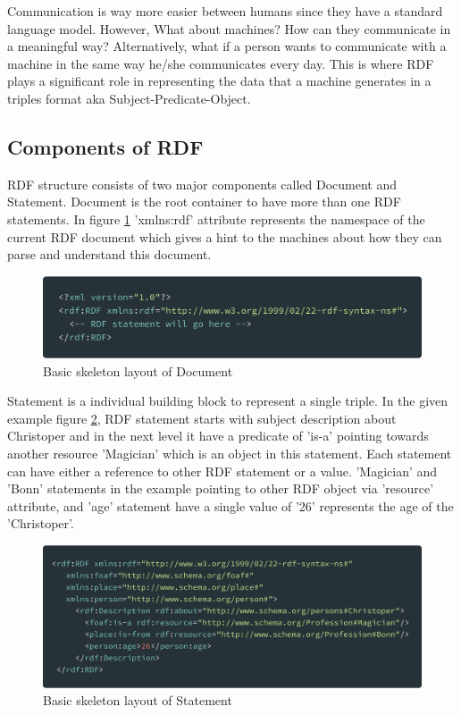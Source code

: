 	Communication is way more easier between humans since they have a standard language model. However, What about machines? How can they communicate in a meaningful way? Alternatively, what if a person wants to communicate with a machine in the same way he/she communicates every day. This is where RDF plays a significant role in representing the data that a machine generates in a triples format aka Subject-Predicate-Object.
	
	\subsection{Components of RDF}
	
		RDF structure consists of two major components called Document and Statement. Document is the root container to have more than one RDF statements. In figure \ref{fig:rdf_document} 'xmlns:rdf' attribute represents the namespace of the current RDF document which gives a hint to the machines about how they can parse and understand this document.
		\begin{figure}[!htbp] 
			\begin{center}
				\includegraphics[scale=0.1]{./images/png/rdf/document}	
				\caption{Basic skeleton layout of Document}	
				\label{fig:rdf_document}	
			\end{center}
		\end{figure}
		
		Statement is a individual building block to represent a single triple. In the given example figure \ref{fig:rdf_statement}, RDF statement starts with subject description about Christoper and in the next level it have a predicate of 'is-a' pointing towards another resource 'Magician' which is an object in this statement. Each statement can have either a reference to other RDF statement or a value. 'Magician' and 'Bonn' statements in the example pointing to other RDF object via 'resource' attribute, and 'age' statement have a single value of '26' represents the age of the 'Christoper'.
		
		\begin{figure}[!htbp] 
			\begin{center}
				\includegraphics[scale=0.1]{./images/png/rdf/statement}	
				\caption{Basic skeleton layout of Statement}	
				\label{fig:rdf_statement}	
			\end{center}
		\end{figure}
	
